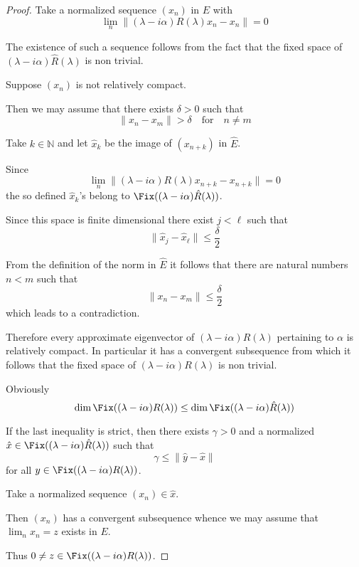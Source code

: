 \begin{proof}
Take a normalized sequence $(x_{n})$ in $E$ with
\[
\lim_{n}\|(\lambda - i\alpha)R(\lambda)x_{n} - x_{n}\| = 0
\]

The existence of such a sequence follows from the fact that the fixed space of $(\lambda-i\alpha)\hat{R}(\lambda)$ is non trivial.

Suppose $(x_{n})$ is not relatively compact.

Then we may assume that there exists $\delta > 0$ such that
\[
\|x_{n} - x_{m}\| > \delta \quad \text{for} \quad n \neq m
\]

Take $k \in \mathbb{N}$ and let $\hat{x}_{k}$ be the image of $(x_{n+k})$ in $\hat{E}$.

Since
\[
\lim_{n}\|(\lambda - i\alpha)R(\lambda)x_{n+k} - x_{n+k}\| = 0
\]
the so defined $\hat{x}_{k}$'s belong to $\Fix((\lambda - i\alpha)\hat{R}(\lambda))$.

Since this space is finite dimensional there exist $j < \ell$ such that
\[
\|\hat{x}_{j} - \hat{x}_{\ell}\| \leq \frac{\delta}{2}
\]

From the definition of the norm in $\hat{E}$ it follows that there are natural numbers $n < m$ such that
\[
\|x_{n} - x_{m}\| \leq \frac{\delta}{2}
\]
which leads to a contradiction.

Therefore every approximate eigenvector of $(\lambda - i\alpha)R(\lambda)$ pertaining to $\alpha$ is relatively compact.
In particular it has a convergent subsequence from which it follows that the fixed space of $(\lambda - i\alpha)R(\lambda)$ is non trivial.

Obviously
\[
\dim \Fix((\lambda - i\alpha)R(\lambda)) \leq \dim \Fix((\lambda - i\alpha)\hat{R}(\lambda))
\]






If the last inequality is strict, then there exists $\gamma > 0$ and a normalized $\hat{x} \in \Fix((\lambda - i\alpha)\hat{R}(\lambda))$ such that
\[
\gamma \leq \|\hat{y} - \hat{x}\|
\]
for all $y \in \Fix((\lambda - i\alpha)R(\lambda))$.

Take a normalized sequence $(x_{n}) \in \hat{x}$.

Then $(x_{n})$ has a convergent subsequence whence we may assume that $\lim_{n} x_{n} = z$ exists in $E$.

Thus $0 \neq z \in \Fix((\lambda - i\alpha)R(\lambda))$.


\end{proof}
